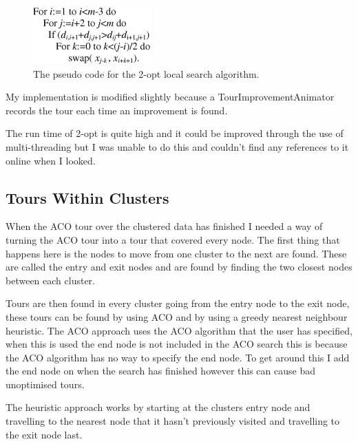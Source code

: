 \begin{figure}[h]
    \centering
    \includegraphics[width=\textwidth]{figures/2_opt_pseudo_code.jpg}
    \caption{The pseudo code for the 2-opt local search algorithm.\cite{2-opt_pseudo_code}}
    \label{fig:2-opt-epseudo-code}
\end{figure}

My implementation is modified slightly because a TourImprovementAnimator records the tour each time an improvement is found.

The run time of 2-opt is quite high and it could be improved through the use of multi-threading but I was unable to do this and couldn't find any references to it online when I looked.

\subsection{Tours Within Clusters}

When the ACO tour over the clustered data has finished I needed a way of turning the ACO tour into a tour that covered every node. The first thing that happens here is the nodes to move from one cluster to the next are found. These are called the entry and exit nodes and are found by finding the two closest nodes between each cluster. 

Tours are then found in every cluster going from the entry node to the exit node, these tours can be found by using ACO and by using a greedy nearest neighbour heuristic. The ACO approach uses the ACO algorithm that the user has specified, when this is used the end node is not included in the ACO search this is because the ACO algorithm has no way to specify the end node. To get around this I add the end node on when the search has finished however this can cause bad unoptimised tours.

The heuristic approach works by starting at the clusters entry node and travelling to the nearest node that it hasn't previously visited and travelling to the exit node last.


